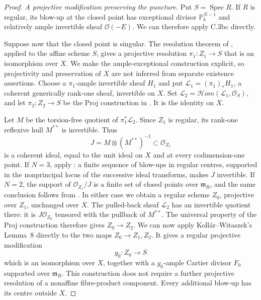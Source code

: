 \begin{proof}
\emph{A projective modification preserving the puncture.}
Put \(S=\operatorname{Spec}R\). If \(R\) is regular, its blow-up at
the closed point has exceptional divisor \(\mathbb P^{N-1}_k\)
and relatively ample invertible sheaf \(\mathcal O(-E)\).
We can therefore apply C.3bc directly.

Suppose now that the closed point is singular.
The resolution theorem of
\citet[Theorem 1.1, current author version pp.~3--4]
{frC3bdCossartPiltant2019}, applied to the affine scheme \(S\),
gives a projective resolution \(\pi_1:Z_1\to S\) that is an
isomorphism over \(X\). We make the ample-exceptional
construction explicit, so projectivity and preservation of
\(X\) are not inferred from separate existence assertions.
Choose a \(\pi_1\)-ample invertible sheaf \(H_1\) and put
\(\mathcal L_1=(\pi_1)_*H_1\), a coherent generically rank-one
sheaf, invertible on \(X\). Set
\(\mathcal L_2=\mathcal Hom(\mathcal L_1,\mathcal O_S)\), and
let \(\pi_2:Z_2\to S\) be the Proj construction in
\citet[Lemma 8, author pp.~2--3]{frC3bdKollarWitaszek2026}.
It is the identity on \(X\).

Let \(M\) be the torsion-free quotient of
\(\pi_1^*\mathcal L_2\). Since \(Z_1\) is regular, its
rank-one reflexive hull \(M^{**}\) is invertible. Thus
\[
                    J=M\otimes(M^{**})^{-1}
                              \subset\mathcal O_{Z_1}
\]
is a coherent ideal, equal to the unit ideal on \(X\) and
at every codimension-one point. If \(N=3\), apply
\citet[Proposition 4.4, author p.~141]
{frC3bdCossartPiltant2019}: a finite sequence of blow-ups
in regular centres, supported in the nonprincipal locus of
the successive ideal transforms, makes \(J\) invertible.
If \(N=2\), the support of \(\mathcal O_{Z_1}/J\) is a finite
set of closed points over \(\mathfrak m_R\), and the same
conclusion follows from
\citet[Lemma 54.4.1, Tag 0AHH]{frC3bdStacksPrincipalization}.
In either case we obtain a regular scheme \(Z_0\), projective
over \(Z_1\), unchanged over \(X\).
The pulled-back sheaf \(\mathcal L_2\) has an invertible
quotient there: it is \(J\mathcal O_{Z_0}\) tensored with the
pullback of \(M^{**}\). The universal property of the Proj
construction therefore gives \(Z_0\to Z_2\).
We can now apply Koll\'ar--Witaszek's Lemma~8 directly to
the two maps \(Z_0\to Z_1,Z_2\). It gives a regular
projective modification
\[
                              g_0:Z_0\longrightarrow S
\]
which is an isomorphism over \(X\), together with a
\(g_0\)-ample Cartier divisor \(F_0\) supported over
\(\mathfrak m_R\).
This construction does not require a further projective
resolution of a nonaffine fibre-product component. Every
additional blow-up has its centre outside \(X\).


\end{proof}
